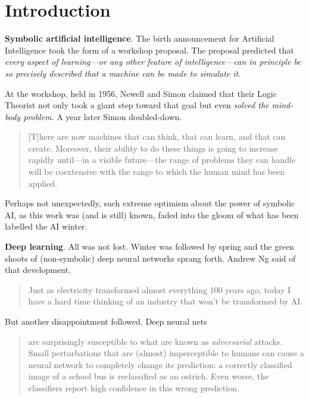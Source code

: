 

\section{Introduction}

\noindent\textbf{Symbolic artificial intelligence}. The birth announcement for Artificial Intelligence took the form of a workshop proposal. The proposal predicted that \textit{every aspect of learning---or any other feature of intelligence---can in principle be so precisely described that a machine can be made to simulate it.}\cite{mccarthy2006proposal}  

At the workshop, held in 1956, Newell and Simon claimed that their Logic Theorist not only took a giant step toward that goal but even \textit{solved the mind-body problem}.\cite{russell2010artificial} A year later Simon doubled-down.
\begin{quote}
    [T]here are now machines that can think, that can learn, and that can create. Moreover, their ability to do these things is going to increase rapidly until---in a visible future---the range of problems they can handle will be coextensive with the range to which the human mind has been applied.\cite{simon1957models}
\end{quote}

Perhaps not unexpectedly, such extreme optimism about the power of symbolic AI, as this work was (and is still) known, faded into the gloom of what has been labelled the AI winter. 

\smallv\noindent\textbf{Deep learning}. All was not lost. Winter was followed by spring and the green shoots of (non-symbolic) deep neural networks sprang forth. Andrew Ng said of that development, 
\begin{quote}
Just as electricity transformed almost everything 100 years ago, today I have a hard time thinking of an industry that won't be transformed by AI.\cite{ng2018ai}
\end{quote}

But another disappointment followed. Deep neural nets 
\begin{quote}
are surprisingly susceptible to what are known as \textit{adversarial} attacks. Small perturbations that are (almost) imperceptible to humans can cause a neural network to completely change its prediction: a correctly classified image of a school bus is reclassified as an ostrich. Even worse, the classifiers report high confidence in this wrong prediction.\cite{akhtar2018threat}
\end{quote}


